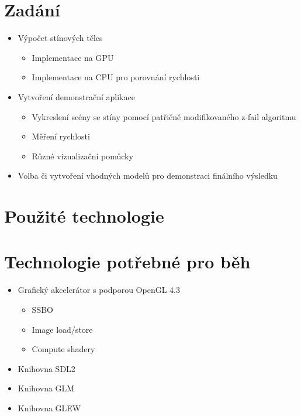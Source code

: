 \documentclass[11pt,a4paper]{article}
\begin{document}
\titlepageandcontents

\section{Zadání}

\begin{itemize}
	\item Výpočet stínových těles
		\begin{itemize}
			\item Implementace na GPU
			\item Implementace na CPU pro porovnání rychlosti
		\end{itemize}
	\item Vytvoření demonstrační aplikace
		\begin{itemize}
			\item Vykreslení scény se stíny pomocí patřičně modifikovaného z-fail algoritmu
			\item Měření rychlosti
			\item Různé vizualizační pomůcky
		\end{itemize}
	\item Volba či vytvoření vhodných modelů pro demonstraci finálního výsledku
\end{itemize}

\section{Použité technologie}

\section{Technologie potřebné pro běh}
\begin{itemize}
	\item Grafický akcelerátor s podporou OpenGL 4.3
		\begin{itemize}
			\item SSBO
			\item Image load/store
			\item Compute shadery
		\end{itemize}
	\item Knihovna SDL2
	\item Knihovna GLM
	\item Knihovna GLEW
\end{itemize}
\end{document}
